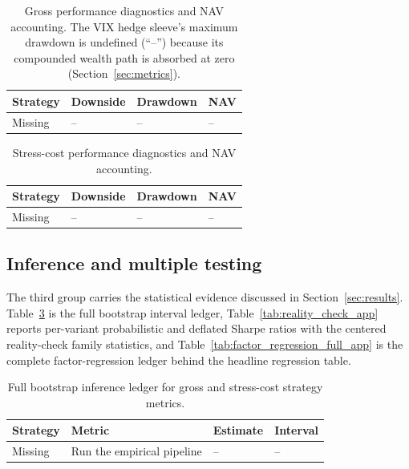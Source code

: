 \clearpage

\begin{table}[H]
\centering
\scriptsize
{}
  {\resizebox{\textwidth}{!}{}}
  {\begin{tabular}{llll}\toprule Strategy & Downside & Drawdown & NAV \\\midrule Missing & -- & -- & -- \\\bottomrule\end{tabular}}
\caption{Gross performance diagnostics and NAV accounting. The VIX hedge sleeve's maximum
drawdown is undefined (``--'') because its compounded wealth path is absorbed at zero
(Section~\ref{sec:metrics}).}
\label{tab:performance_diag_app}
\end{table}

\begin{table}[H]
\centering
\scriptsize
{}
  {\resizebox{\textwidth}{!}{}}
  {\begin{tabular}{llll}\toprule Strategy & Downside & Drawdown & NAV \\\midrule Missing & -- & -- & -- \\\bottomrule\end{tabular}}
\caption{Stress-cost performance diagnostics and NAV accounting.}
\label{tab:performance_net_diag_app}
\end{table}

\subsection{Inference and multiple testing}

The third group carries the statistical evidence discussed in Section~\ref{sec:results}.
Table~\ref{tab:inference_app} is the full bootstrap interval ledger,
Table~\ref{tab:reality_check_app} reports per-variant probabilistic and deflated Sharpe
ratios with the centered reality-check family statistics, and
Table~\ref{tab:factor_regression_full_app} is the complete factor-regression ledger behind
the headline regression table.

\begin{table}[H]
\centering
\scriptsize
{}
  {\resizebox{0.92\textwidth}{!}{}}
  {\begin{tabular}{llll}\toprule Strategy & Metric & Estimate & Interval \\\midrule Missing & Run the empirical pipeline & -- & -- \\\bottomrule\end{tabular}}
\caption{Full bootstrap inference ledger for gross and stress-cost strategy metrics.}
\label{tab:inference_app}
\end{table}


